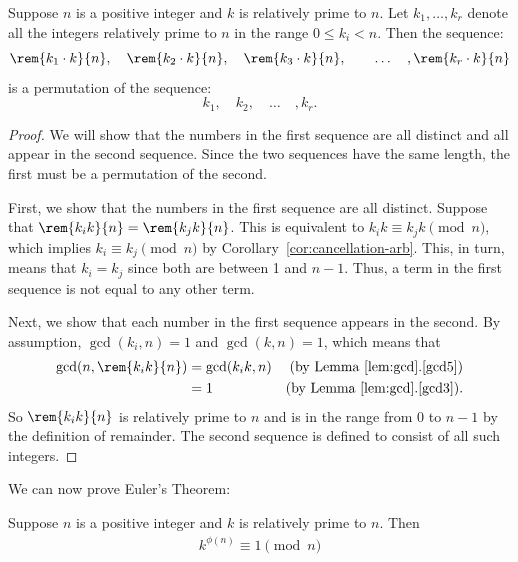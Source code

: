 \begin{lemma}
\label{lem:permutes-arb}
Suppose $n$ is a positive integer and $k$ is relatively prime to $n$.
Let $k_1, \dots, k_r$ denote all the integers relatively prime to $n$
in the range $0 \leq k_i < n$.  Then the sequence:
%
\[
\rem{k_1 \cdot k}{n},\quad
\rem{k_2 \cdot k}{n},\quad
\rem{k_3 \cdot k}{n},\quad
\quad \dots\quad,
\rem{k_r \cdot k}{n}
\]
%
is a permutation of the sequence:
%
\[
k_1,\quad k_2,\quad \dots\quad, k_r.
\]
\end{lemma}

\begin{proof}
We will show that the numbers in the first sequence are all distinct
and all appear in the second sequence.  Since the two sequences have
the same length, the first must be a permutation of the second.

First, we show that the numbers in the first sequence are all
distinct.  Suppose that $\rem{k_i k}{n} = \rem{k_j k}{n}$.  This is
equivalent to $k_i k \equiv k_j k \pmod{n}$, which implies $k_i \equiv
k_j \pmod{n}$ by Corollary~\ref{cor:cancellation-arb}.  This, in turn,
means that $k_i = k_j$ since both are between 1 and $n-1$.  Thus, a
term in the first sequence is not equal to any other term.

Next, we show that each number in the first sequence appears in the
second.  By assumption, $\gcd(k_i, n) = 1$ and $\gcd(k, n) = 1$, which
means that
%
\begin{align*}
\gcd(n, \rem{k_i k}{n}) & = \gcd(k_i k, n)
            & \text{(by Lemma~\ref{lem:gcd}.\ref{gcd5})}\\
      & = 1 & \text{(by Lemma~\ref{lem:gcd}.\ref{gcd3})}.
\end{align*}
%
So $\rem{k_i k}{n}$ is relatively prime to $n$ and is in the range from 0
to $n - 1$ by the definition of remainder.  The second sequence is defined
to consist of all such integers.
\end{proof}

We can now prove Euler's Theorem:

\begin{theorem}
Suppose $n$ is a positive integer and $k$ is relatively prime to $n$.
Then
\begin{eqnarray*}
k^{\phi(n)} \equiv 1 \pmod{n}
\end{eqnarray*}
\end{theorem}

